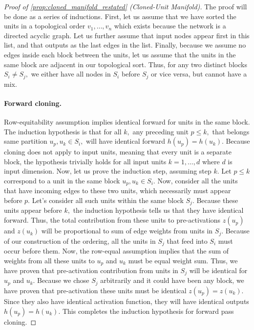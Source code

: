 \documentclass{article}
\numberwithin{figure}{section}
\begin{document}
\begin{proof}[Proof of \cref{prop:cloned_manifold_restated} (Cloned-Unit Manifold)]
The proof will be done as a series of inductions. 
First, let us assume that we have sorted the units in a topological order $v_1,\dots, v_n$ which exists because the network is a directed acyclic graph. Let us further assume that input nodes appear first in this list, and that outputs as the last edges in the list. Finally, because we assume no edges inside each block between the units, let us assume that the units in the same block are adjacent in our topological sort. Thus, for any two distinct blocks $S_i\neq S_j,$ we either have all nodes in $S_i$ before $S_j$ or vice versa, but cannot have a mix. 
\paragraph{Forward cloning.} Row-equitability assumption implies identical forward for units in the same block. The induction hypothesis is that for all $k,$ any preceding unit $p \le k,$ that belongs same partition  $ u_p, u_k \in S_i ,$  will have identical forward $h(u_p) = h(u_k). $ Because cloning does not apply to input units, meaning that every unit is a separate block, the hypothesis trivially holds for all input units $k=1,\dots, d$ where $d$ is input dimension. Now, let us prove the induction step, assuming step $k.$ Let $p\le k$ correspond to a unit in the same block $u_p,u_k  \in S_i. $ Now, consider all the units that have incoming edges to these two units, which necessarily must appear before $p$. Let's consider all such units within the same block $S_j.$ Because these units appear before $k,$ the induction hypothesis tells us that they have identical forward. Thus, the total contribution from these units to pre-activations $z(u_p)$ and $z(u_k)$ will be proportional to sum of edge weights from units in $S_j$. Because of our construction of the ordering, all the units in $S_j$ that feed into $S_i$ must occur before them. 
Now, the row-equal assumption implies that the sum of weights from all these units to $u_p $ and $u_k$ must be equal weight sum. Thus, we have proven that pre-activation contribution from units in  $S_j$ will be identical for $u_p$ and $u_k$. Because we chose $S_j$ arbitrarily and it could have been any block, we have proven that pre-activation these units must be identical $z(u_p)=z(u_k)$. Since they also have identical activation function, they will have identical outputs $h(u_p)=h(u_k)$. This completes the induction hypothesis for forward pass cloning. 

\end{proof}
\end{document}
